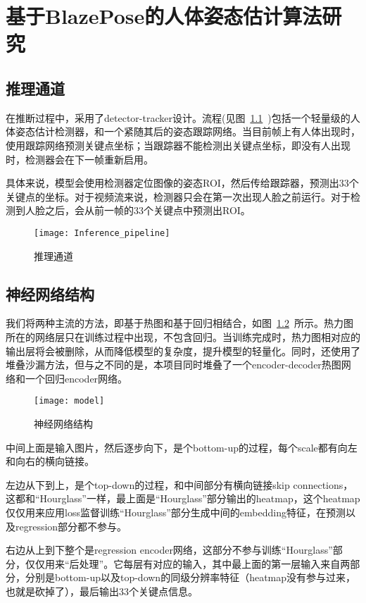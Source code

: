 
\chapter{基于BlazePose的人体姿态估计算法研究}

\section{推理通道}

在推断过程中，采用了detector-tracker设计。流程(见图~\ref{piture:11}~)包括一个轻量级的人体姿态估计检测器，和一个紧随其后的姿态跟踪网络。当目前帧上有人体出现时，使用跟踪网络预测关键点坐标；当跟踪器不能检测出关键点坐标，即没有人出现时，检测器会在下一帧重新启用。

具体来说，模型会使用检测器定位图像的姿态ROI，然后传给跟踪器，预测出33个关键点的坐标。对于视频流来说，检测器只会在第一次出现人脸之前运行。对于检测到人脸之后，会从前一帧的33个关键点中预测出ROI。

\begin{figure}
\centering
\texttt{[image: Inference\_pipeline]}
\caption{推理通道}
\label{piture:11}
\end{figure}

\section{神经网络结构}

我们将两种主流的方法，即基于热图和基于回归相结合，如图~\ref{piture:12}~所示。热力图所在的网络层只在训练过程中出现，不包含回归。当训练完成时，热力图相对应的输出层将会被删除，从而降低模型的复杂度，提升模型的轻量化。同时，还使用了堆叠沙漏方法\cite{newell2016stacked}，但与之不同的是，本项目同时堆叠了一个encoder-decoder热图网络和一个回归encoder网络。

\begin{figure}
\centering
\texttt{[image: model]}
\caption{神经网络结构}
\label{piture:12}
\end{figure}

中间上面是输入图片，然后逐步向下，是个bottom-up的过程，每个scale都有向左和向右的横向链接。

左边从下到上，是个top-down的过程，和中间部分有横向链接skip connections，这都和``Hourglass''一样，最上面是``Hourglass''部分输出的heatmap，这个heatmap仅仅用来应用loss监督训练``Hourglass''部分生成中间的embedding特征，在预测以及regression部分都不参与。

右边从上到下整个是regression encoder网络，这部分不参与训练``Hourglass''部分，仅仅用来``后处理''。它每层有对应的输入，其中最上面的第一层输入来自两部分，分别是bottom-up以及top-down的同级分辨率特征（heatmap没有参与过来，也就是砍掉了），最后输出33个关键点信息。

